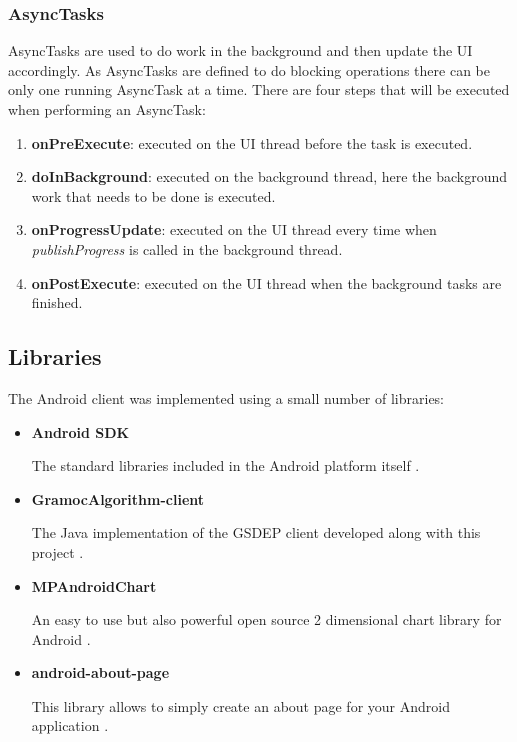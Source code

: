 	\subsubsection{AsyncTasks}
	AsyncTasks are used to do work in the background and then update the UI accordingly. As AsyncTasks are defined to do blocking operations there can be only one running AsyncTask at a time. There are four steps that will be executed when performing an AsyncTask:

	\begin{enumerate}
		\item \textbf{onPreExecute}: executed on the UI thread before the task is executed.
		\item \textbf{doInBackground}: executed on the background thread, here the background work that needs to be done is executed.
		\item \textbf{onProgressUpdate}: executed on the UI thread every time when \emph{publishProgress} is called in the background thread.
		\item \textbf{onPostExecute}: executed on the UI thread when the background tasks are finished.
	\end{enumerate}

\subsection{Libraries}
The Android client was implemented using a small number of libraries:
\begin{itemize}
	\item \textbf{Android SDK}

	The standard libraries included in the Android platform itself \cite{AndroidSDK}.

	\item \textbf{GramocAlgorithm-client}

	The Java implementation of the GSDEP client developed along with this project \cite{GramocAlgorithm-client}.

	\item \textbf{MPAndroidChart}

	An easy to use but also powerful open source 2 dimensional chart library for Android \cite{MPAndroidChart}.

	\item \textbf{android-about-page}

	This library allows to simply create an about page for your Android application \cite{android-about-page}.
\end{itemize}

